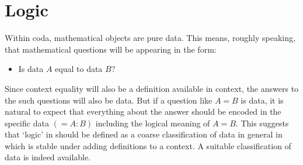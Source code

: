 \documentclass[11pt]{article}
\begin{document}
\section{Logic}

Within coda, mathematical objects are pure data.  This means, roughly speaking, that mathematical questions will be appearing in the form: 
\begin{itemize}
\item[] Is data $A$ equal to data $B$?
\end{itemize}
Since context equality will also be a definition available in context, the answers to the such questions will also be data.  
But if a question like $A=B$ is data, it is natural to expect that everything about the answer should be encoded in the 
specific data $(= A:B)$ including the logical meaning of $A=B$.  
This suggests that `logic' in should be defined as a coarse classification 
of data in general in which is stable under adding definitions to a context.  A suitable classification of data is indeed available.
\end{document}
